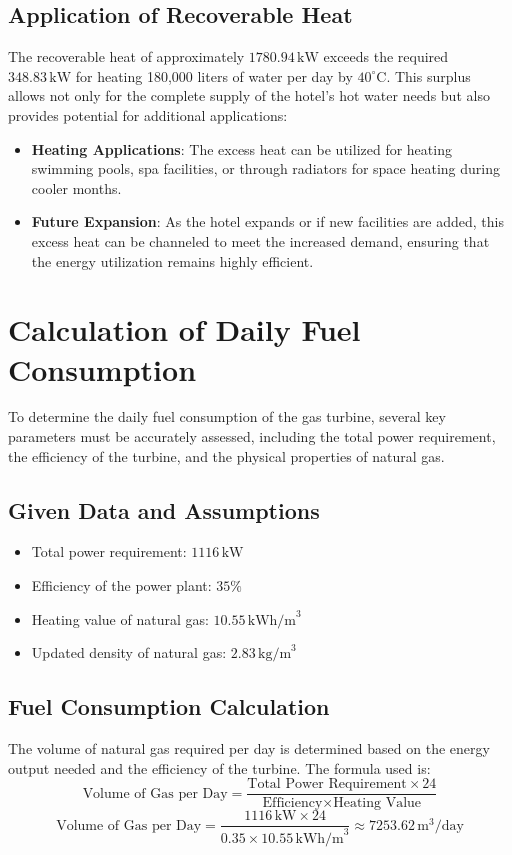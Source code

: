 \documentclass{article}
\begin{document}
\subsection{Application of Recoverable Heat}
The recoverable heat of approximately \(1780.94 \, \text{kW}\) exceeds the required \(348.83 \, \text{kW}\) for heating 180,000 liters of water per day by \(40^\circ\text{C}\). This surplus allows not only for the complete supply of the hotel's hot water needs but also provides potential for additional applications:
\begin{itemize}
    \item \textbf{Heating Applications}: The excess heat can be utilized for heating swimming pools, spa facilities, or through radiators for space heating during cooler months.
    \item \textbf{Future Expansion}: As the hotel expands or if new facilities are added, this excess heat can be channeled to meet the increased demand, ensuring that the energy utilization remains highly efficient.
\end{itemize}

\section{Calculation of Daily Fuel Consumption}
To determine the daily fuel consumption of the gas turbine, several key parameters must be accurately assessed, including the total power requirement, the efficiency of the turbine, and the physical properties of natural gas.

\subsection{Given Data and Assumptions}
\begin{itemize}
    \item Total power requirement: \(1116 \, \text{kW}\)
    \item Efficiency of the power plant: \(35\%\)
    \item Heating value of natural gas: \(10.55 \, \text{kWh/m}^3\)
    \item Updated density of natural gas: \(2.83 \, \text{kg/m}^3\)
\end{itemize}

\subsection{Fuel Consumption Calculation}
The volume of natural gas required per day is determined based on the energy output needed and the efficiency of the turbine. The formula used is:
\[ \text{Volume of Gas per Day} = \frac{\text{Total Power Requirement} \times 24}{\text{Efficiency} \times \text{Heating Value}} \]
\[ \text{Volume of Gas per Day} = \frac{1116 \, \text{kW} \times 24}{0.35 \times 10.55 \, \text{kWh/m}^3} \approx 7253.62 \, \text{m}^3/\text{day} \]
\end{document}
